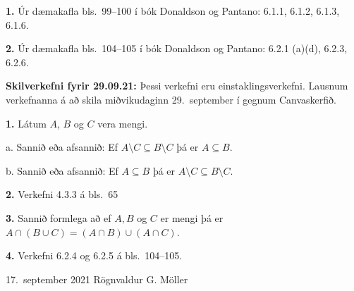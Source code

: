 \documentclass[12pt]{article}
\begin{document}
{\bf 1.}  Úr dæmakafla bls.~99--100 í bók Donaldson og Pantano:  6.1.1, 6.1.2, 6.1.3, 6.1.6.

\smallskip

{\bf 2.}  Úr dæmakafla bls.~104--105 í bók Donaldson og Pantano:  6.2.1 (a)(d), 6.2.3, 6.2.6.


\smallskip



 


\bigskip
{\bf Skilverkefni fyrir 29.09.21:}  Þessi verkefni eru einstaklingsverkefni.  Lausnum verkefnanna á að skila miðvikudaginn 29.~september  í gegnum Canvaskerfið.

\smallskip

{\bf 1.}  Látum $A$, $B$ og $C$ vera mengi.  

a.  Sannið eða afsannið:  Ef $A\setminus C\subseteq B\setminus C$ þá er $A\subseteq B$.

b.  Sannið eða afsannið:  Ef $A\subseteq B$ þá er $A\setminus C\subseteq B\setminus C$.

\smallskip

{\bf 2.}  Verkefni 4.3.3 á bls.~65

\smallskip

{\bf 3.}  Sannið formlega að ef $A, B$ og $C$ er mengi þá er $A\cap (B\cup C)=(A\cap B)\cup (A\cap C)$.

\smallskip

{\bf 4.}  Verkefni 6.2.4 og 6.2.5 á bls.~104--105.



\vfill  17.~september 2021
\hfill  Rögnvaldur G. Möller
\end{document}
